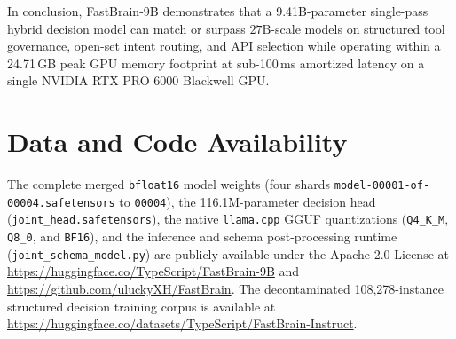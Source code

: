\documentclass[10pt,twocolumn]{article}
\begin{document}
In conclusion, FastBrain-9B demonstrates that a 9.41B-parameter single-pass hybrid decision model can match or surpass $27\text{B}$-scale models on structured tool governance, open-set intent routing, and API selection while operating within a 24.71\,GB peak GPU memory footprint at sub-100\,ms amortized latency on a single NVIDIA RTX PRO 6000 Blackwell GPU.

\section*{Data and Code Availability}
\sloppy
The complete merged \texttt{bfloat16} model weights (four shards \texttt{model-00001-of-00004.safetensors} to \texttt{00004}), the 116.1M-parameter decision head (\texttt{joint\_head.safetensors}), the native \texttt{llama.cpp} GGUF quantizations (\texttt{Q4\_K\_M}, \texttt{Q8\_0}, and \texttt{BF16}), and the inference and schema post-processing runtime (\texttt{joint\_schema\_model.py}) are publicly available under the Apache-2.0 License at \url{https://huggingface.co/TypeScript/FastBrain-9B} and \url{https://github.com/uluckyXH/FastBrain}. The decontaminated 108,278-instance structured decision training corpus is available at \url{https://huggingface.co/datasets/TypeScript/FastBrain-Instruct}.

\setlength{\bibsep}{2.0pt}
{\small


}
\end{document}
